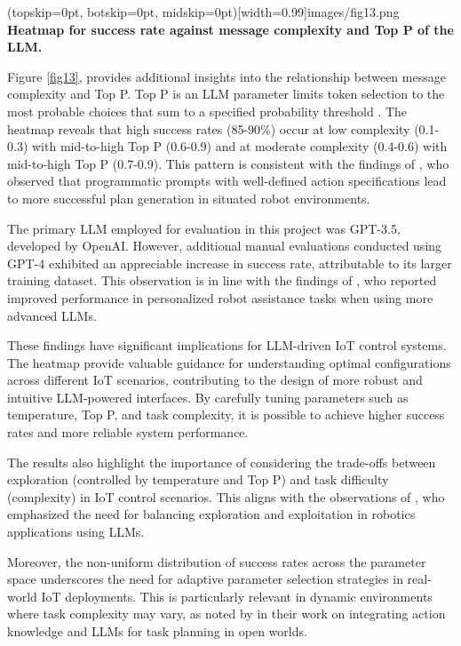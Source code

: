 \documentclass{ieeeaccess}
\begin{document}
\Figure[h!](topskip=0pt, botskip=0pt,
midskip=0pt)[width=0.99\columnwidth]{{images/fig13.png}}
{ \textbf{Heatmap for success rate against message complexity and Top P of the LLM.}\label{fig13}}

Figure \ref{fig13}, provides additional insights into the relationship between message complexity and Top P. Top P is an LLM parameter limits token selection to the most probable choices that sum to a specified probability threshold \cite{rum2024setting}. The heatmap reveals that high success rates (85-90\%) occur at low complexity (0.1-0.3) with mid-to-high Top P (0.6-0.9) and at moderate complexity (0.4-0.6) with mid-to-high Top P (0.7-0.9). This pattern is consistent with the findings of \citet{Singh2023}, who observed that programmatic prompts with well-defined action specifications lead to more successful plan generation in situated robot environments.

The primary LLM employed for evaluation in this project was GPT-3.5, developed by OpenAI. However, additional manual evaluations conducted using GPT-4 exhibited an appreciable increase in success rate, attributable to its larger training dataset. This observation is in line with the findings of \citet{Wu2023}, who reported improved performance in personalized robot assistance tasks when using more advanced LLMs.

These findings have significant implications for LLM-driven IoT control systems. The heatmap provide valuable guidance for understanding optimal configurations across different IoT scenarios, contributing to the design of more robust and intuitive LLM-powered interfaces. By carefully tuning parameters such as temperature, Top P, and task complexity, it is possible to achieve higher success rates and more reliable system performance.

The results also highlight the importance of considering the trade-offs between exploration (controlled by temperature and Top P) and task difficulty (complexity) in IoT control scenarios. This aligns with the observations of \citet{10500490}, who emphasized the need for balancing exploration and exploitation in robotics applications using LLMs.

Moreover, the non-uniform distribution of success rates across the parameter space underscores the need for adaptive parameter selection strategies in real-world IoT deployments. This is particularly relevant in dynamic environments where task complexity may vary, as noted by \citet{Ding2023} in their work on integrating action knowledge and LLMs for task planning in open worlds.
\end{document}
